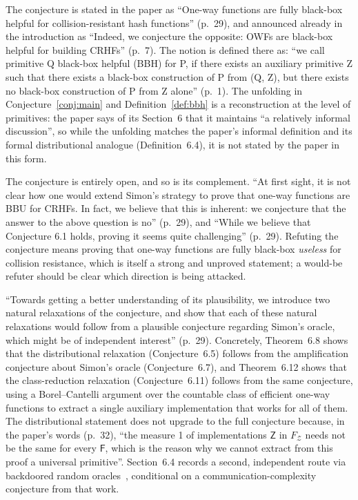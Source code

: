 \documentclass{aicr-conjecture}
\newcommand{\Zc}{\mathcal{Z}}
\newcommand{\Fs}{\mathsf{F}}
\newcommand{\Zs}{\mathsf{Z}}
\begin{document}
\begin{remark}\label{rem:phrasing}
The conjecture is stated in the paper as ``One-way functions are fully
black-box helpful for collision-resistant hash functions'' (p.~29), and
announced already in the introduction as ``Indeed, we conjecture the
opposite: OWFs are black-box helpful for building CRHFs'' (p.~7). The
notion is defined there as: ``we call primitive Q black-box helpful (BBH)
for P, if there exists an auxiliary primitive Z such that there exists a
black-box construction of P from (Q, Z), but there exists no black-box
construction of P from Z alone'' (p.~1). The unfolding in
Conjecture~\ref{conj:main} and Definition~\ref{def:bbh} is a
reconstruction at the level of primitives: the paper says of its
Section~6 that it maintains ``a relatively informal discussion'', so
while the unfolding matches the paper's informal definition and its
formal distributional analogue (Definition~6.4), it is not stated by the
paper in this form.
\end{remark}

\begin{remark}[openness]\label{rem:open}
The conjecture is entirely open, and so is its complement. ``At first
sight, it is not clear how one would extend Simon's strategy to prove
that one-way functions are BBU for CRHFs. In fact, we believe that this
is inherent: we conjecture that the answer to the above question is no''
(p.~29), and ``While we believe that Conjecture 6.1 holds, proving it
seems quite challenging'' (p.~29). Refuting the conjecture means proving
that one-way functions are fully black-box \emph{useless} for collision
resistance, which is itself a strong and unproved statement; a would-be
refuter should be clear which direction is being attacked.
\end{remark}

\begin{remark}\label{rem:progress}
``Towards getting a better understanding of its plausibility, we
introduce two natural relaxations of the conjecture, and show that each
of these natural relaxations would follow from a plausible conjecture
regarding Simon's oracle, which might be of independent interest''
(p.~29). Concretely, Theorem~6.8 shows that the distributional
relaxation (Conjecture~6.5) follows from the amplification conjecture
about Simon's oracle (Conjecture~6.7), and Theorem~6.12 shows that the
class-reduction relaxation (Conjecture~6.11) follows from the same
conjecture, using a Borel--Cantelli argument over the countable class of
efficient one-way functions to extract a single auxiliary implementation
that works for all of them. The distributional statement does not upgrade
to the full conjecture because, in the paper's words (p.~32), ``the
measure 1 of implementations $\Zs$ in $F_{\Zc}$ needs not be the same for
every $\Fs$, which is the reason why we cannot extract from this proof a
universal primitive''. Section~6.4 records a second, independent route via
backdoored random oracles~\cite{BFM18}, conditional on a
communication-complexity conjecture from that work.
\end{remark}
\end{document}
